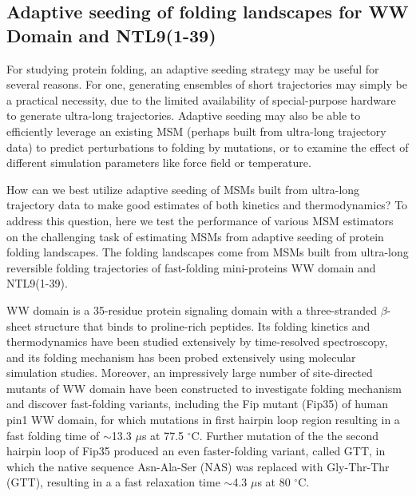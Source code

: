\documentclass[%
 aip,
rsi,%
 amsmath,amssymb,
 reprint,%
]{revtex4-1}
\begin{document}

\subsection*{Adaptive seeding of folding landscapes for WW Domain and NTL9(1-39)}

For studying protein folding, an adaptive seeding strategy may be useful for several reasons. For one, generating ensembles of short trajectories may simply be a practical necessity, due to the limited availability of special-purpose hardware to generate ultra-long trajectories.  Adaptive seeding may also be able to efficiently leverage an existing MSM (perhaps built from ultra-long trajectory data) to predict perturbations to folding by mutations, or to examine the effect of different simulation parameters like force field or temperature. 

How can we best utilize adaptive seeding of MSMs built from ultra-long trajectory data to make good estimates of both kinetics and thermodynamics?  To address this question, here we test the performance of various MSM estimators on the challenging task of estimating MSMs from adaptive seeding of protein folding landscapes.  The folding landscapes come from MSMs built from ultra-long reversible folding trajectories of fast-folding mini-proteins WW domain and NTL9(1-39).

WW domain is a 35-residue protein signaling domain with a three-stranded $\beta$-sheet structure that binds to proline-rich peptides.  Its folding kinetics and thermodynamics have been studied extensively by time-resolved spectroscopy,\cite{Nguyen:2003gw,Jager:2006ga,Liu:2008fs,Dave:2016joa,Liu:2008kj} and its folding mechanism has been probed extensively using molecular simulation studies.\cite{Gao:2017kna,Best:2013hua,Piana:2011gma} Moreover, an impressively large number of site-directed mutants of WW domain have been constructed to investigate folding mechanism and discover fast-folding variants, including the Fip mutant (Fip35) of human pin1 WW domain, for which mutations in first hairpin loop region resulting in a fast folding time of $\sim$13.3 $\mu$s at 77.5 $^{\circ}$C.\cite{Jager:2006ga,Nguyen:2005ec}  Further mutation of the the second hairpin loop of Fip35 produced an even faster-folding variant, called GTT, in which the native sequence Asn-Ala-Ser (NAS) was replaced with Gly-Thr-Thr (GTT), resulting in a a fast relaxation time $\sim$4.3 $\mu$s at 80 $^{\circ}$C.\cite{Piana:2011gma}   
\end{document}

